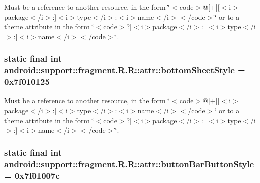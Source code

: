 Must be a reference to another resource, in the form \char`\"{}$<$code$>$@\mbox{[}+\mbox{]}\mbox{[}$<$i$>$package$<$/i$>$:\mbox{]}$<$i$>$type$<$/i$>$:$<$i$>$name$<$/i$>$$<$/code$>$\char`\"{} or to a theme attribute in the form \char`\"{}$<$code$>$?\mbox{[}$<$i$>$package$<$/i$>$:\mbox{]}\mbox{[}$<$i$>$type$<$/i$>$:\mbox{]}$<$i$>$name$<$/i$>$$<$/code$>$\char`\"{}. \hypertarget{classandroid_1_1support_1_1fragment_1_1_r_1_1attr_bf1933f029435138197fa58756f71b0f}{
\subsubsection[{bottomSheetStyle}]{\setlength{\rightskip}{0pt plus 5cm}static final int android::support::fragment.R.R::attr::bottomSheetStyle = 0x7f010125}}
\label{classandroid_1_1support_1_1fragment_1_1_r_1_1attr_bf1933f029435138197fa58756f71b0f}


Must be a reference to another resource, in the form \char`\"{}$<$code$>$@\mbox{[}+\mbox{]}\mbox{[}$<$i$>$package$<$/i$>$:\mbox{]}$<$i$>$type$<$/i$>$:$<$i$>$name$<$/i$>$$<$/code$>$\char`\"{} or to a theme attribute in the form \char`\"{}$<$code$>$?\mbox{[}$<$i$>$package$<$/i$>$:\mbox{]}\mbox{[}$<$i$>$type$<$/i$>$:\mbox{]}$<$i$>$name$<$/i$>$$<$/code$>$\char`\"{}. \hypertarget{classandroid_1_1support_1_1fragment_1_1_r_1_1attr_b90f2fa7474892bd38f66360e56a8696}{
\subsubsection[{buttonBarButtonStyle}]{\setlength{\rightskip}{0pt plus 5cm}static final int android::support::fragment.R.R::attr::buttonBarButtonStyle = 0x7f01007c}}
\label{classandroid_1_1support_1_1fragment_1_1_r_1_1attr_b90f2fa7474892bd38f66360e56a8696}


